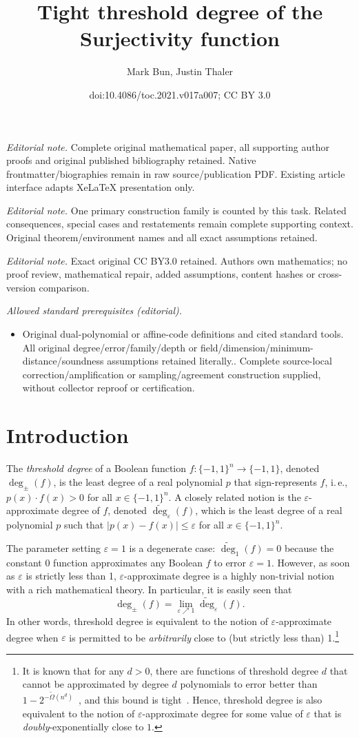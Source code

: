 \documentclass[11pt]{article}
\title{Tight threshold degree of the Surjectivity function}
\author{Mark Bun, Justin Thaler}
\date{doi:10.4086/toc.2021.v017a007; CC BY 3.0}
\numberwithin{equation}{section}
\theoremstyle{definition}
\theoremstyle{plain}
\newcommand{\ie}{i.\,e.}
\newcommand{\bits}{\{-1,1\}}
\newcommand{\eps}{\varepsilon}
\newcommand{\adeg}{\widetilde{\operatorname{deg}}}
\begin{document}
\maketitle
\noindent\textit{Editorial note.} Complete original mathematical paper, all supporting author proofs and original published bibliography retained. Native frontmatter/biographies remain in raw source/publication PDF. Existing article interface adapts XeLaTeX presentation only.\par\medskip
\noindent\textit{Editorial note.} One primary construction family is counted by this task. Related consequences, special cases and restatements remain complete supporting context. Original theorem/environment names and all exact assumptions retained.\par\medskip
\noindent\textit{Editorial note.} Exact original CC BY3.0 retained. Authors own mathematics; no proof review, mathematical repair, added assumptions, content hashes or cross-version comparison.\par\medskip
\noindent\textit{Allowed standard prerequisites (editorial).}\begin{itemize}
\item Original dual-polynomial or affine-code definitions and cited standard tools. All original degree/error/family/depth or field/dimension/minimum-distance/soundness assumptions retained literally.. Complete source-local correction/amplification or sampling/agreement construction supplied, without collector reproof or certification.
\end{itemize}\medskip
\section{Introduction}
The \emph{threshold degree} of a Boolean function $f\colon \bits^n \to \bits$, denoted $\deg_{\pm}(f)$, 
is the least degree of a real polynomial $p$ that sign-represents $f$, \ie, $p(x) \cdot f(x) > 0$
for all $x \in \bits^n$.
A closely related notion is the $\eps$-approximate degree of $f$, denoted $\adeg_{\eps}(f)$, which is the least degree of a 
real polynomial $p$ such that $|p(x)-f(x)| \leq \eps$ for all $x \in \bits^n$. 

The parameter setting $\eps=1$ is a degenerate case: $\adeg_1(f)=0$ because 
the constant 0 function approximates any Boolean $f$ to error $\eps=1$. 
However, as soon as $\eps$ is strictly less than 1, $\eps$-approximate degree is a highly non-trivial
notion with a rich mathematical theory.
In particular, it is easily seen that 
$$\deg_{\pm}(f)=\lim_{\eps \nearrow 1} \adeg_{\eps}(f).$$ In other words, threshold degree is equivalent to the notion of $\eps$-approximate
degree when $\eps$ is permitted to be \emph{arbitrarily} close to (but strictly less than) 1.\footnote{It is known that for any $d > 0$, there are functions of threshold degree $d$
	that cannot be approximated by degree $d$ polynomials to error better than $1-2^{-\tilde{\Omega}(n^d)}$~\cite{podolskii2007perceptrons},
	and this bound is tight~\cite{bvdw}. Hence, threshold degree is also equivalent to the notion of $\eps$-approximate degree for some value of $\eps$
	that is \emph{doubly}-exponentially close to $1$.}
\end{document}
